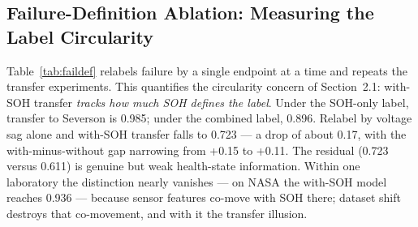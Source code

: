 \documentclass[preprint,12pt]{elsarticle}
\begin{document}
\subsection{Failure-Definition Ablation: Measuring the Label Circularity}
Table~\ref{tab:faildef} relabels failure by a single endpoint at a time and repeats the transfer experiments. This quantifies the circularity concern of Section~2.1: with-SOH transfer \emph{tracks how much SOH defines the label}. Under the SOH-only label, transfer to Severson is 0.985; under the combined label, 0.896. Relabel by voltage sag alone and with-SOH transfer falls to 0.723 --- a drop of about 0.17, with the with-minus-without gap narrowing from +0.15 to +0.11. The residual (0.723 versus 0.611) is genuine but weak health-state information. Within one laboratory the distinction nearly vanishes --- on NASA the with-SOH model reaches 0.936 --- because sensor features co-move with SOH there; dataset shift destroys that co-movement, and with it the transfer illusion.

\begin{table}[!t]
\caption{Failure-Definition Ablation at H=20 (XGBoost, ALL-LCO Source, Pooled AUC [CI]): Transfer With and Without SOH as a Feature, for Three Label Endpoints.}
\label{tab:faildef}
\centering
{}
\end{table}
\end{document}
